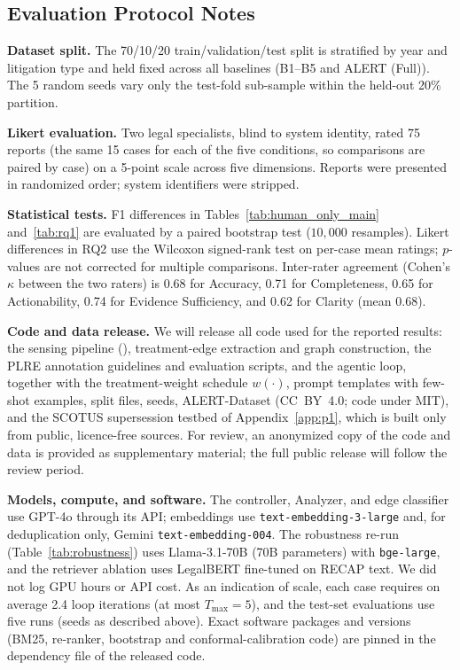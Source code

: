 \subsection{Evaluation Protocol Notes}

\textbf{Dataset split.} The 70/10/20 train/validation/test split is stratified by year and litigation type and held fixed across all baselines (B1--B5 and ALERT (Full)). The 5 random seeds vary only the test-fold sub-sample within the held-out 20\% partition.

\textbf{Likert evaluation.} Two legal specialists, blind to system identity, rated 75 reports (the same 15 cases for each of the five conditions, so comparisons are paired by case) on a 5-point scale across five dimensions. Reports were presented in randomized order; system identifiers were stripped.

\textbf{Statistical tests.} F1 differences in Tables~\ref{tab:human_only_main} and~\ref{tab:rq1} are evaluated by a paired bootstrap test ($10{,}000$ resamples). Likert differences in RQ2 use the Wilcoxon signed-rank test on per-case mean ratings; $p$-values are not corrected for multiple comparisons. Inter-rater agreement (Cohen's $\kappa$ between the two raters) is 0.68 for Accuracy, 0.71 for Completeness, 0.65 for Actionability, 0.74 for Evidence Sufficiency, and 0.62 for Clarity (mean 0.68).

\textbf{Code and data release.} We will release all code used for the reported results: the sensing pipeline (\trackername{}), treatment-edge extraction and graph construction, the PLRE annotation guidelines and evaluation scripts, and the agentic loop, together with the treatment-weight schedule $w(\cdot)$, prompt templates with few-shot examples, split files, seeds, ALERT-Dataset (CC~BY~4.0; code under MIT), and the SCOTUS supersession testbed of Appendix~\ref{app:p1}, which is built only from public, licence-free sources. For review, an anonymized copy of the code and data is provided as supplementary material; the full public release will follow the review period.

\textbf{Models, compute, and software.} The controller, Analyzer, and edge classifier use GPT-4o through its API; embeddings use \texttt{text-embedding-3-large} and, for deduplication only, Gemini \texttt{text-embedding-004}. The robustness re-run (Table~\ref{tab:robustness}) uses Llama-3.1-70B (70B parameters) with \texttt{bge-large}, and the retriever ablation uses LegalBERT fine-tuned on RECAP text. We did not log GPU hours or API cost. As an indication of scale, each case requires on average 2.4 loop iterations (at most $T_{\max}{=}5$), and the test-set evaluations use five runs (seeds as described above). Exact software packages and versions (BM25, re-ranker, bootstrap and conformal-calibration code) are pinned in the dependency file of the released code.

